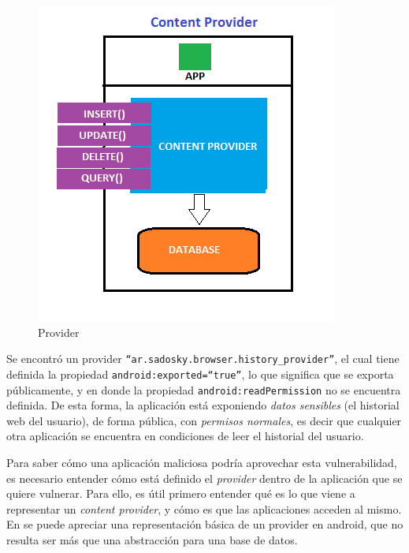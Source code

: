 \documentclass[11pt, a4paper, twoside]{article}
\begin{document}
\begin{figure}
\begin{center}
\includegraphics[scale=0.45]{android-provider.png}
\end{center}
\vspace{-20pt}
\caption{Provider}
\label{fig:android-provider}
\vspace{-30pt}
\end{figure}

Se encontró un provider {\color{blue}\texttt{``ar.sadosky.browser.history\_provider''}}, el cual tiene definida la propiedad \texttt{{\color{red}android:exported}={\color{blue}``true''}}, lo que significa que se exporta públicamente, y en donde la propiedad \texttt{\color{red}android:readPermission} no se encuentra definida. De esta forma, la aplicación está exponiendo \emph{datos sensibles} (el historial web del usuario), de forma pública, con \emph{permisos normales}, es decir que cualquier otra aplicación se encuentra en condiciones de leer el historial del usuario.

Para saber cómo una aplicación maliciosa podría aprovechar esta vulnerabilidad, es necesario entender cómo está definido el \emph{provider} dentro de la aplicación que se quiere vulnerar. Para ello, es útil primero entender qué es lo que viene a representar un \emph{content provider}, y cómo es que las aplicaciones acceden al mismo. En  se puede apreciar una representación básica de un provider en android, que no resulta ser más que una abstracción para una base de datos. 
\end{document}
